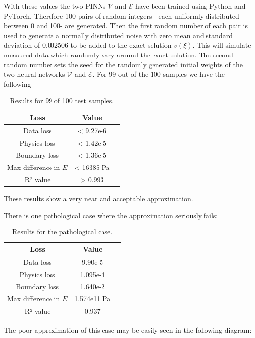 \documentclass[a4paper,11pt]{article}
\begin{document}
With these values the two PINNs $\mathscr{V}$ and $\mathscr{E} $ have been trained using Python and PyTorch. Therefore 100 pairs of random integers - each uniformly distributed between 0 and 100- are generated. Then the first random number of each pair is used to generate a normally distributed noise with zero mean and standard deviation of 0.002506 to be added to the exact solution $v(\xi ) $. This will simulate measured data which randomly vary around the exact solution. The second random number sets the seed for the randomly generated initial weights of the two neural networks $\mathscr{V}$ and $\mathscr{E} $.
For 99 out of the 100 samples we have the following 
\begin{table}[h!]
\centering
\begin{tabular}{ccl}
\toprule
\textbf{Loss} & \textbf{Value}\\
\midrule
Data loss & < 9.27e-6\\
Physics loss & < 1.42e-5\\
Boundary loss & < 1.36e-5 \\
Max difference in $E $ & < 16385 Pa \\
R² value & > 0.993 \\
\bottomrule
\end{tabular}
\caption{Results for 99 of 100 test samples.}
\end{table}
These results show a very near and acceptable approximation.

There is one pathological case where the approximation seriously fails:
\begin{table}[h!]
\centering
\begin{tabular}{ccl}
\toprule
\textbf{Loss} & \textbf{Value}\\
\midrule
Data loss & 9.90e-5\\
Physics loss & 1.095e-4 \\
Boundary loss &  1.640e-2 \\
Max difference in $E $ & 1.574e11 Pa \\
R² value &  0.937 \\
\bottomrule
\end{tabular}
\caption{Results for the pathological case.}
\end{table}
The poor approximation of this case may be easily seen in the following diagram:
\end{document}
